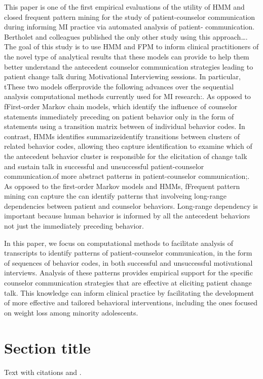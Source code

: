 This paper is one of the first empirical evaluations of the utility of HMM and closed frequent pattern mining for the study of patient-counselor communication during informing MI practice via automated analysis of patient- communication. Bertholet and colleagues published the only other study using this approach…. The goal of this study is to use HMM and FPM to inform clinical practitioners of the novel type of analytical results that these models can provide to help them better understand the antecedent counselor communication strategies leading to patient change talk during Motivational Interviewing sessions. In particular, tThese two models offerprovide the following advances over the sequential analysis computational methods currently used for MI research:. 
As opposed to fFirst-order Markov chain models, which identify the influence of counselor statements immediately preceding on patient behavior only in the form of statements using a transition matrix between of individual behavior codes. In contrast, HMMs identifies summarizeidentify transitions between clusters of related behavior codes, allowing theo capture identification to examine which of the antecedent behavior cluster is responsible for the elicitation of change talk and sustain talk in successful and unsuccessful patient-counselor communication.of more abstract patterns in patient-counselor communication;. 
As opposed to the first-order Markov models and HMMs, fFrequent pattern mining can capture the can identify patterns that involveing long-range dependencies between patient and counselor behaviors. Long-range dependency is important because human behavior is informed by all the antecedent behaviors not just the immediately preceding behavior.

In this paper, we focus on computational methods to facilitate analysis of transcripts to identify patterns of patient-counselor communication, in the form of sequences of behavior codes, in both successful and unsuccessful motivational interviews. Analysis of these patterns provides empirical support for the specific counselor communication strategies that are effective at eliciting patient change talk. This knowledge can inform clinical practice by facilitating the development of more effective and tailored behavioral interventions, including the ones focused on weight loss among minority adolescents.
\section{Section title}
\label{sec:1}
Text with citations \citep{wei2006semi} and \citep{keogh2000scaling}.
